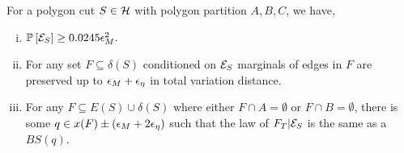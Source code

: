\begin{corollary}\label{cor:poly-reduction}
For a polygon cut $S\in\mathcal{H}$ with polygon partition $A,B,C$, we have, 
\begin{enumerate}[i)]
\item ${\mathbb{P}}\left[{\cal E}_S\right] \ge 0.0245{\epsilon}_M^2.$
\item For any set $F\subseteq \delta(S)$ 	conditioned on ${\cal E}_S$ marginals of edges in $F$ are preserved up to ${\epsilon}_M+{\epsilon}_\eta$ in total variation distance.
\item For any $F\subseteq E(S)\cup \delta(S)$ where either $F \cap A=\emptyset$ or $F\cap B=\emptyset$, there is some $q\in x(F)\pm ({\epsilon}_M + 2{\epsilon}_\eta)$ such that the law of $F_T | {\cal E}_S$ is the same as a $BS(q)$.
\end{enumerate}
\end{corollary}
